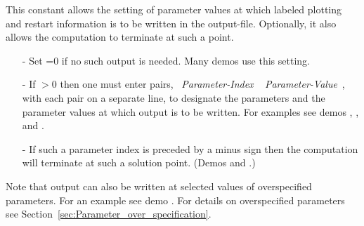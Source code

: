  This constant allows the setting of parameter values at which labeled plotting 
 and restart information is to be written in the  output-file.
 Optionally, it also allows the computation to terminate at such a point.

\begin{itemize}
\item[-]
 Set =0 if no such output is needed. Many demos use this setting.
\item[-]
 If $>$0 then one must enter  pairs,
            ~{\it Parameter-Index} ~ {\it Parameter-Value}~,
 with each pair on a separate line, to designate the parameters and the parameter
 values at which output is to be written.
 For examples see demos , , and .
\item[-]
 If such a parameter index is preceded by a minus sign then the computation will
 terminate at such a solution point.
 (Demos  and .)
\end{itemize}

Note that  output can also be written at selected values of 
overspecified parameters. For an example see demo .
For details on overspecified parameters see 
Section~\ref{sec:Parameter_over_specification}.
